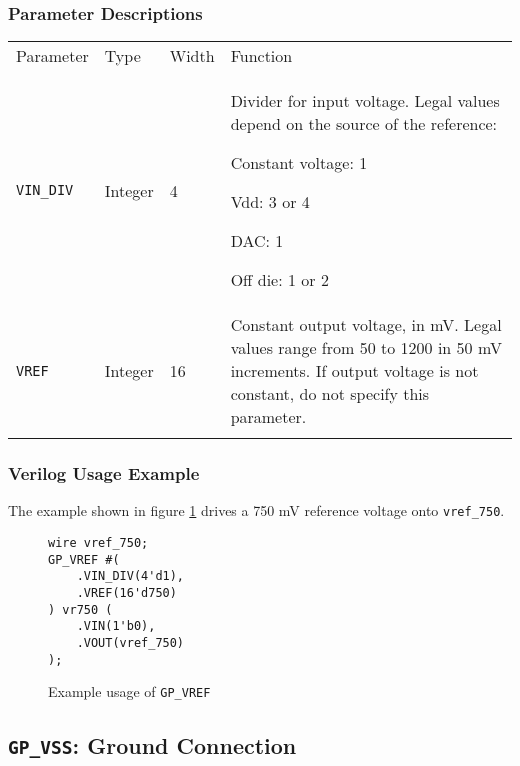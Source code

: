 \documentclass[11pt]{article}
\newcommand{\tokenstyle}[1]{\texttt{#1}}
\newcommand{\wirestyle}[1]{\texttt{#1}}
\newcommand{\whenstyle}[1]{{\fontseries{sb}\selectfont#1}}
\newcommand{\thinhline}{\Xhline{1\arrayrulewidth}}
\newcommand{\thickhline}{\Xhline{2.5\arrayrulewidth}}
\newcommand{\novspace}{\vspace*{-\baselineskip}}
\begin{document}
\subsubsection{Parameter Descriptions}

\begin{tabularx}{\textwidth}{lllX}
\thinhline
\whenstyle{Parameter} & \whenstyle{Type} & \whenstyle{Width} & \whenstyle{Function} \\
\thickhline
\tokenstyle{VIN\_DIV} & Integer & 4 &
	Divider for input voltage. Legal values depend on the source of the reference:
	\begin{compactitem}
		\item Constant voltage: 1
		\item Vdd: 3 or 4
		\item DAC: 1
		\item Off die: 1 or 2\novspace
	\end{compactitem}
\\
\thinhline
\tokenstyle{VREF} & Integer & 16 &
	Constant output voltage, in mV. Legal values range from 50 to 1200 in 50 mV increments.
	If output voltage is not constant, do not specify this parameter.\\
\thinhline
\end{tabularx}

\subsubsection{Verilog Usage Example}

The example shown in figure \ref{gp-vref-example} drives a 750 mV reference voltage onto \wirestyle{vref\_750}.

\begin{figure}[h]
\begin{lstlisting}
wire vref_750;
GP_VREF #(
	.VIN_DIV(4'd1),
	.VREF(16'd750)
) vr750 (
	.VIN(1'b0),
	.VOUT(vref_750)
);
\end{lstlisting}
\caption{Example usage of \tokenstyle{GP\_VREF}}
\label{gp-vref-example}
\end{figure}


\clearpage
\pagebreak
\subsection{\tokenstyle{GP\_VSS}: Ground Connection}
\end{document}
